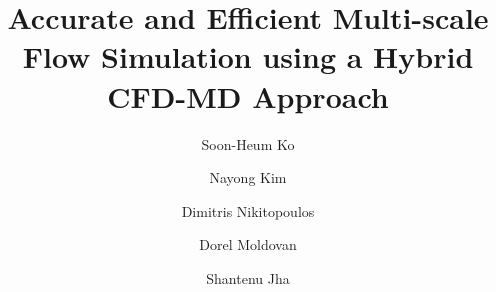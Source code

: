 \documentclass[preprint,12pt]{elsarticle}
\newcommand{\skonote}[1]{ {\textcolor{green} { ***Jeff: #1 }}}
\newcommand{\skonote}[1]{}
\begin{document}
\begin{frontmatter}



\title{Accurate and Efficient Multi-scale Flow Simulation using a Hybrid CFD-MD Approach}
\author[add0,add1]{Soon-Heum Ko}
\author[add1]{Nayong Kim}
\author[add3]{Dimitris Nikitopoulos}
\author[add3]{Dorel Moldovan}
\author[add1,add2]{Shantenu Jha}
\address[add1]{Center for Computation \& Technology, Louisiana State University, Baton Rouge, LA 70803, USA}
\address[add0]{National Supercomputing Centre, Link\"{o}ping University, Link\"{o}ping, SE-581 83, Sweden}
\address[add2]{Department of Computer Science, Louisiana State University, Baton Rouge, LA 70803, USA}
\address[add3]{Department of Mechanical Engineering, Louisiana State University, Baton Rouge, LA 70803, USA}


\end{frontmatter}
\end{document}
